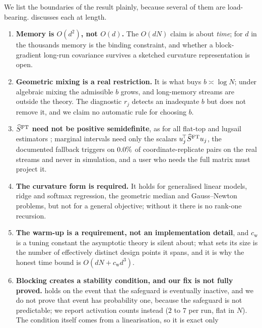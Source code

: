 We list the boundaries of the result plainly, because several of them are load-bearing.
 discusses each at length.

\begin{enumerate}[label=(L\arabic*),leftmargin=2.6em,itemsep=2pt,topsep=2pt]
\item \textbf{Memory is $O(d^2)$, not $O(d)$.} The $O(dN)$ claim is about \emph{time}; for $d$ in the
thousands memory is the binding constraint, and whether a block-gradient long-run covariance survives a
sketched curvature representation is open.
\item \textbf{Geometric mixing is a real restriction.} It is what buys $b\asymp\log N$; under algebraic
mixing the admissible $b$ grows, and long-memory streams are outside the theory. The diagnostic $r_j$
detects an inadequate $b$ but does not remove it, and we claim no automatic rule for choosing $b$.
\item \textbf{$\widehat{S}^{\mathrm{FT}}$ need not be positive semidefinite}, as for all flat-top and lugsail estimators
\citep[Remark~5]{singh2025utility}; marginal intervals need only the scalars $u_j^{\!\top}\widehat{S}^{\mathrm{FT}} u_j$, the
documented fallback triggers on $0.0\%$ of coordinate-replicate pairs on the real streams and
never in simulation, and a user who needs the full matrix must project it.
\item \textbf{The curvature form is required.} It holds for generalised linear models, ridge and softmax
regression, the geometric median and Gauss--Newton problems, but not for a general objective; without it
there is no rank-one recursion.
\item \textbf{The warm-up is a requirement, not an implementation detail}, and $c_{\mathrm w}$ is a
tuning constant the asymptotic theory is silent about; what sets its size is the number of effectively
distinct design points it spans, and it is why the honest time bound is $O(dN+c_{\mathrm w}d^3)$.
\item \textbf{Blocking creates a stability condition, and our fix is not fully proved.}
 holds on the event that the safeguard is eventually inactive, and we do not prove that
event has probability one, because the safeguard is not predictable; we report activation counts instead
($2$ to $7$ per run, flat in $N$). The condition itself comes from a linearisation, so it is exact only

\end{enumerate}

